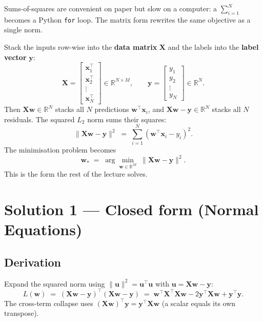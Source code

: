 \documentclass[11pt, a4paper]{article}
\begin{document}
Sums-of-squares are convenient on paper but slow on a computer: a $\sum_{i=1}^N$ becomes a Python \texttt{for} loop. The matrix form rewrites the same objective as a single norm.

Stack the inputs row-wise into the \textbf{data matrix} $\mathbf{X}$ and the labels into the \textbf{label vector} $\mathbf{y}$:
\[
\mathbf{X} = \begin{bmatrix}\mathbf{x}_1^\top \\ \mathbf{x}_2^\top \\ \vdots \\ \mathbf{x}_N^\top\end{bmatrix} \in \mathbb{R}^{N\times M},
\qquad
\mathbf{y} = \begin{bmatrix}y_1 \\ y_2 \\ \vdots \\ y_N\end{bmatrix} \in \mathbb{R}^N.
\]
Then $\mathbf{X}\mathbf{w}\in\mathbb{R}^N$ stacks all $N$ predictions $\mathbf{w}^\top\mathbf{x}_i$, and $\mathbf{X}\mathbf{w}-\mathbf{y}\in\mathbb{R}^N$ stacks all $N$ residuals. The squared $L_2$ norm sums their squares:
\[
\|\mathbf{X}\mathbf{w} - \mathbf{y}\|^2 \;=\; \sum_{i=1}^N (\mathbf{w}^\top\mathbf{x}_i - y_i)^2.
\]
The minimisation problem becomes
\[
\boxed{\;\mathbf{w}_* \;=\; \arg\min_{\mathbf{w}\in\mathbb{R}^M} \; \|\mathbf{X}\mathbf{w} - \mathbf{y}\|^2.\;}
\]
This is the form the rest of the lecture solves.

\section{Solution 1 — Closed form (Normal Equations)}

\subsection{Derivation}

Expand the squared norm using $\|\mathbf{u}\|^2 = \mathbf{u}^\top\mathbf{u}$ with $\mathbf{u} = \mathbf{X}\mathbf{w}-\mathbf{y}$:
\[
L(\mathbf{w}) \;=\; (\mathbf{X}\mathbf{w}-\mathbf{y})^\top(\mathbf{X}\mathbf{w}-\mathbf{y})
\;=\; \mathbf{w}^\top\mathbf{X}^\top\mathbf{X}\mathbf{w} - 2\mathbf{y}^\top\mathbf{X}\mathbf{w} + \mathbf{y}^\top\mathbf{y}.
\]
The cross-term collapse uses $(\mathbf{X}\mathbf{w})^\top\mathbf{y} = \mathbf{y}^\top\mathbf{X}\mathbf{w}$ (a scalar equals its own transpose).
\end{document}
